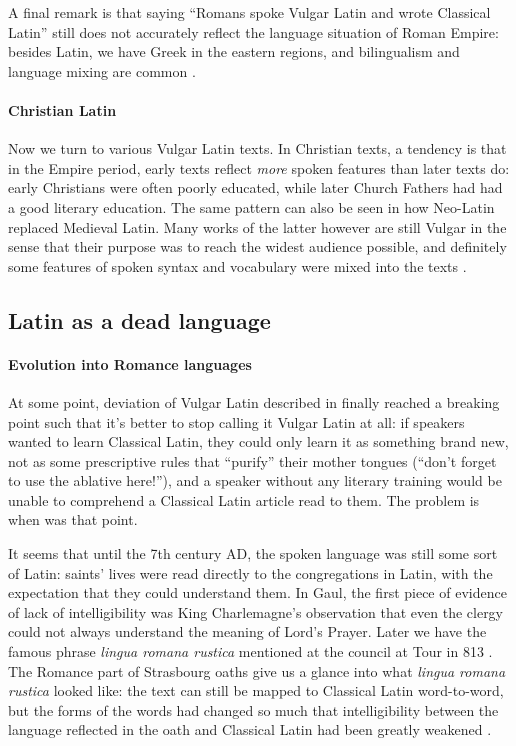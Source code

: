 \documentclass[a4paper, oneside, 12pt]{report}
\newcommand*{\citesec}[1]{\S~{#1}}
\newcommand*{\citepage}[1]{p.~{#1}}
\newcommand*{\citepages}[1]{pp.~{#1}}
\newcommand{\form}[1]{\emph{#1}}
\begin{document}
A final remark is that 
saying ``Romans spoke Vulgar Latin and wrote Classical Latin'' 
still does not accurately reflect the language situation of Roman Empire:
besides Latin, we have Greek in the eastern regions,
and bilingualism and language mixing are common
\citep[\citesec{7.2}]{clackson2011blackwell}.

\paragraph*{Christian Latin}
Now we turn to various Vulgar Latin texts.
In Christian texts, a tendency is that in the Empire period,
early texts reflect \emph{more} spoken features than later texts do:
early Christians were often poorly educated,
while later Church Fathers had had a good literary education.
The same pattern can also be seen in how Neo-Latin replaced Medieval Latin.
Many works of the latter however are still Vulgar
in the sense that their purpose was to reach the widest audience possible,
and definitely some features of spoken syntax and vocabulary were mixed into the texts
\citep[\citepage{24}]{herman2010vulgar}.

\subsection{Latin as a dead language}

\paragraph*{Evolution into Romance languages}
At some point, deviation of Vulgar Latin described in  
finally reached a breaking point
such that it's better to stop calling it Vulgar Latin at all:
if speakers wanted to learn Classical Latin,
they could only learn it as something brand new,
not as some prescriptive rules that ``purify'' their mother tongues 
(``don't forget to use the ablative here!''),
and a speaker without any literary training would be unable to comprehend 
a Classical Latin article read to them.
The problem is when was that point.

It seems that until the 7th century AD, the spoken language was still some sort of Latin:
saints' lives were read directly to the congregations in Latin,
with the expectation that they could understand them.
In Gaul, the first piece of evidence of lack of intelligibility
was King Charlemagne's observation that even the clergy 
could not always understand the meaning of Lord's Prayer.
Later we have the famous phrase \form{lingua romana rustica}
mentioned at the council at Tour in 813
\citep[\citepage{114}]{herman2010vulgar}.
The Romance part of Strasbourg oaths give us a glance into what \form{lingua romana rustica} looked like:
the text can still be mapped to Classical Latin word-to-word,
but the forms of the words had changed so much
that intelligibility between the language reflected in the oath and Classical Latin
had been greatly weakened \citep[\citepages{300-301}]{clackson2011blackwell}.
\end{document}
